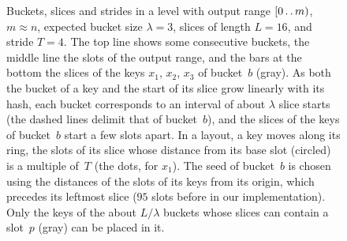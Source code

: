 \documentclass[11pt]{article}
\def\..{\,\mathpunct{\ldotp\ldotp}} %
\begin{document}
\begin{figure}[t]
\centering
{}
\caption{\label{fig:geometry}Buckets, slices and strides in a level with
output range $[0\..m)$, $m\approx n$, expected bucket size $\lambda=3$,
slices of length $L=16$, and stride $T=4$. The top line shows some
consecutive buckets, the middle line the slots of the output range, and the
bars at the bottom the slices of the keys $x_1$, $x_2$, $x_3$ of
bucket~$b$ (gray). As both the bucket of a key and the start of its slice
grow linearly with its hash, each bucket corresponds to an interval of about
$\lambda$ slice starts (the dashed lines delimit that of bucket~$b$), and
the slices of the keys of bucket~$b$ start a few slots apart. In a layout,
a key moves along its ring, the slots of its slice whose distance from its
base slot (circled) is a multiple of~$T$ (the dots, for $x_1$). The seed of
bucket~$b$ is chosen using the distances of the slots of its keys from its
origin, which precedes its leftmost slice ($95$ slots before in our
implementation). Only the keys of the about $L/\lambda$ buckets whose
slices can contain a slot~$p$ (gray) can be placed in it.}
\end{figure}
\end{document}
